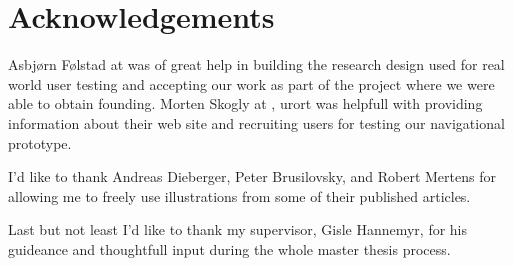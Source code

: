 \chapter{Acknowledgements}

Asbj\o{}rn F\o{}lstad at  was of great help in building the
research design used for real world user testing and accepting our work as
part of the  project where we were able to obtain founding.
Morten Skogly at ,
urort{} was helpfull with providing information about their web site and
recruiting users for testing our navigational prototype.

I'd like to thank
Andreas Dieberger,
Peter Brusilovsky, and
Robert Mer\-t\-ens
for allowing me to freely use illustrations from
some of their published articles.

Last but not least I'd like to thank my supervisor, Gisle Hannemyr, for
his guideance and thoughtfull input during the whole master thesis process.
